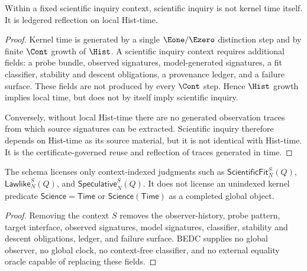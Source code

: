 \begin{proposition}
\label{prop:science-not-time-itself}
Within a fixed scientific inquiry context, scientific inquiry is not
kernel time itself. It is ledgered reflection on local Hist-time.
\end{proposition}

\begin{proof}
Kernel time is generated by a single $\Eone/\Ezero$ distinction step and
by finite $\Cont$ growth of $\Hist$. A scientific inquiry context requires
additional fields: a probe bundle, observed signatures, model-generated
signatures, a fit classifier, stability and descent obligations, a
provenance ledger, and a failure surface. These fields are not produced
by every $\Cont$ step. Hence $\Hist$ growth implies local time, but does
not by itself imply scientific inquiry.

Conversely, without local Hist-time there are no generated observation
traces from which source signatures can be extracted. Scientific inquiry
therefore depends on Hist-time as its source material, but it is not
identical with Hist-time. It is the certificate-governed reuse and
reflection of traces generated in time.
\end{proof}

\begin{corollary}
\label{cor:no-context-free-science-time-predicate}
The schema licenses only context-indexed judgments such as
$\mathsf{ScientificFit}^{S}_{N}(Q)$, $\mathsf{Lawlike}^{S}_{N}(Q)$, and
$\mathsf{Speculative}^{S}_{N}(Q)$. It does not license an unindexed
kernel predicate $\mathsf{Science}=\mathsf{Time}$ or
$\mathsf{Science}(\mathsf{Time})$ as a completed global object.
\end{corollary}

\begin{proof}
Removing the context $S$ removes the observer-history, probe pattern,
target interface, observed signatures, model signatures, classifier,
stability and descent obligations, ledger, and failure surface. BEDC
supplies no global observer, no global clock, no context-free classifier,
and no external equality oracle capable of replacing these fields.
\end{proof}

